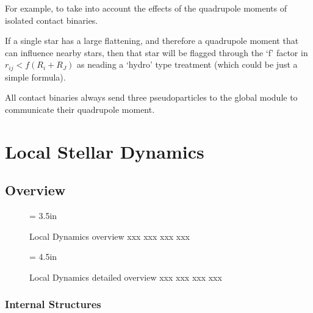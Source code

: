 \documentclass{article}[12pt]
\def\filler{xxxx xxxx xxxx xxxx xxxx xxxx xxxx xxxx xxxx xxxx xxxx xxxx
xxxx xxxx xxxx xxxx xxxx xxxx xxxx xxxx xxxx xxxx xxxx xxxx
xxxx xxxx xxxx xxxx xxxx xxxx xxxx xxxx xxxx xxxx xxxx xxxx
xxxx xxxx xxxx xxxx xxxx xxxx xxxx xxxx xxxx xxxx xxxx xxxx
xxxx xxxx xxxx xxxx xxxx xxxx xxxx xxxx xxxx xxxx xxxx xxxx
xxxx xxxx xxxx xxxx xxxx xxxx xxxx xxxx xxxx xxxx xxxx xxxx
xxxx xxxx xxxx xxxx xxxx xxxx xxxx xxxx xxxx xxxx xxxx xxxx
xxxx xxxx xxxx xxxx xxxx xxxx xxxx xxxx xxxx xxxx xxxx xxxx}
\def\filler{}
\begin{document}

For example, to take into account the effects of the quadrupole
moments of isolated contact binaries.


\filler


If a single star has a large flattening, and therefore a quadrupole
moment that can influence nearby stars, then that star will be flagged
through the `f' factor in $r_{ij} < f(R_i + R_J)$ as neading a `hydro'
type treatment (which could be just a simple formula).

All contact binaries always send three pseudoparticles to the global
module to communicate their quadrupole moment.

\clearpage
\newpage

\section{Local Stellar Dynamics}

\filler

\subsection{Overview}

\begin{figure}[htb]
\begin{center}
\epsfxsize = 3.5in
\caption
{Local Dynamics overview xxx xxx xxx xxx}
\label{fig:lsd1}
\end{center}
\end{figure}

\begin{figure}[htb]
\begin{center}
\epsfxsize = 4.5in
\caption
{Local Dynamics detailed overview xxx xxx xxx xxx}
\label{fig:lsd2}
\end{center}
\end{figure}

\clearpage

\filler

\subsubsection{Internal Structures}

\filler
\end{document}
